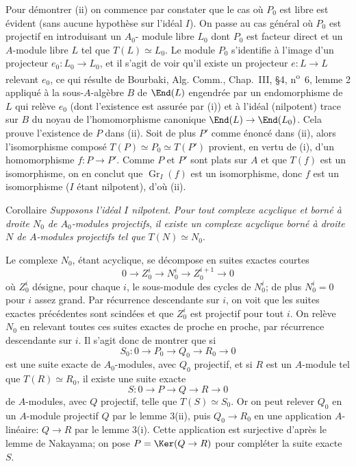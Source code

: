 Pour démontrer (ii) on commence par constater que le cas où $P_0$ est libre est évident (sans aucune hypothèse sur l'idéal $I$). On passe au cas général où $P_0$ est projectif en introduisant un $A_0$-%
module libre $L_0$ dont $P_0$ est facteur direct et un $A$-module libre $L$ tel que $T(L)\simeq L_0$. Le module $P_0$ s'identifie à l'image d'un projecteur $e_0:L_0\to L_0$, et il s'agit de voir qu'il existe un projecteur $e:L\to L$ relevant $e_0$, ce qui résulte de Bourbaki, Alg. Comm., Chap.~III, §4, n\textsuperscript{o}~6, lemme 2 appliqué à la sous-$A$-algèbre $B$ de $\End(L)$ engendrée par un endomorphisme de $L$ qui relève $e_0$ (dont l'existence est assurée par (i)) et à l'idéal (nilpotent) trace sur $B$ du noyau de l'homomorphisme canonique $\End(L)\to\End(L_0)$. Cela prouve l'existence de $P$ dans (ii). Soit de plus $P'$ comme énoncé dans (ii), alors l'isomorphisme composé $T(P)\simeq P_0\simeq T(P')$ provient, en vertu de (i), d'un homomorphisme $f:P\to P'$. Comme $P$ et $P'$ sont plats sur $A$ et que $T(f)$ est un isomorphisme, on en conclut que $\operatorname{Gr}_I(f)$ est un isomorphisme, donc $f$ est un isomorphisme ($I$ étant nilpotent), d'où (ii).

\begin{statement}{Corollaire}
\emph{Supposons l'idéal $I$ nilpotent}. \emph{Pour tout complexe acyclique et borné à droite $N_0$ de $A_0$-modules projectifs}, \emph{il existe un complexe acyclique borné à droite $N$ de $A$-modules projectifs tel que} $T(N)\simeq N_0$.
\end{statement}

Le complexe $N_0$, étant acyclique, se décompose en suites exactes courtes
\[
0\longrightarrow Z_0^i\longrightarrow N_0^i\longrightarrow Z_0^{i+1}\longrightarrow0
\]
où $Z_0^i$ désigne, pour chaque $i$, le sous-module des cycles de $N_0^i$; de plus $N_0^i=0$ pour $i$ assez grand. Par récurrence descendante sur $i$, on voit que les suites exactes précédentes sont scindées et que $Z_0^i$ est projectif pour tout $i$. On relève $N_0$ en relevant toutes 
ces
suites exactes de proche en proche, par récurrence descendante sur $i$. Il s'agit donc de montrer que si
\[
S_0:0\longrightarrow P_0\longrightarrow Q_0\longrightarrow R_0\longrightarrow0
\]
est une suite exacte de $A_0$-modules, avec $Q_0$ projectif, et si $R$ est un $A$-module tel que $T(R)\simeq R_0$, il existe une suite exacte
\[
S:0\longrightarrow P\longrightarrow Q\longrightarrow R\longrightarrow0
\]
de $A$-modules, avec $Q$ projectif, telle que $T(S)\simeq S_0$. Or on peut relever $Q_0$ en un $A$-module projectif $Q$ par le lemme 3(ii), puis $Q_0\to R_0$ en une application $A$-linéaire: $Q\to R$ par le lemme 3(i). Cette application est surjective d'après le lemme de Nakayama; on pose $P=\Ker(Q\to R)$ pour compléter la suite exacte $S$.

